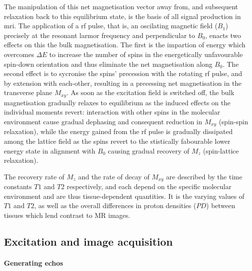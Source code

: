 The manipulation of this net magnetisation vector away from, and subsequent relaxation back to this equilibrium state, is the basis of all signal production in \gls{mri}.
The application of a \gls{rf} pulse, that is, an oscilating magnetic field ($B_1$) precisely at the resonant larmor frequency and perpendicular to $B_0$, enacts two effects on this the bulk magnetisation.
The first is the impartion  of energy which overcomes $\Delta E$  to increase the number of spins in the energetically unfavourable spin-down orientation and thus eliminate the net magnetisation along $B_0$.
The second effect is to sycronise the spins' precession with the rotating \gls{rf} pulse, and by extension with each-other, resulting in a precessing net magnetisation in the transverse plane $M_{xy}$.
As soon as the excitation field is switched off, the bulk magnetisation gradually relaxes to equilibrium as the induced effects on the individual moments revert:
interaction with other spins  in the molecular environment cause gradual dephasing and consequent reduction in $M_{xy}$ (spin-spin relaxation), while the energy gained from the \gls{rf} pulse is gradually dissipated among the lattice field  as the spins revert to the stistically fabourable lower energy state in alignment with $B_0$ causing gradual recovery of $M_z$ (spin-lattice relaxation).

The recovery rate of $M_z$ and the rate of decay of $M_{xy}$ are described by the time constants $T1$ and $T2$ respectively, and each depend on the specific molecular environment and are thus tissue-dependent quantities.
It is the varying values of $T1$ and $T2$, as well as the overall differences in proton densities ($PD$) between tissues which lend contrast to MR images.

\subsection{Excitation and image acquisition}


\paragraph*{Generating echos}

